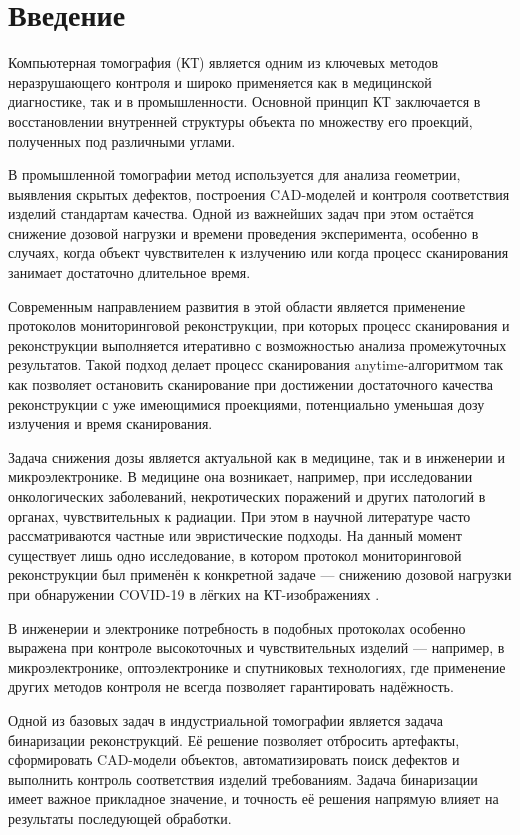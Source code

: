 \section{Введение}

Компьютерная томография (КТ) является одним из ключевых методов неразрушающего контроля и широко применяется как в медицинской диагностике, так и в промышленности. Основной принцип КТ заключается в восстановлении внутренней структуры объекта по множеству его проекций, полученных под различными углами.

В промышленной томографии метод используется для анализа геометрии, выявления скрытых дефектов, построения CAD-моделей и контроля соответствия изделий стандартам качества. Одной из важнейших задач при этом остаётся снижение дозовой нагрузки и времени проведения эксперимента, особенно в случаях, когда объект чувствителен к излучению или когда процесс сканирования занимает достаточно длительное время.

Современным направлением развития в этой области является применение протоколов мониторинговой реконструкции, при которых процесс сканирования и реконструкции выполняется итеративно с возможностью анализа промежуточных результатов. Такой подход делает процесс сканирования anytime-алгоритмом так как позволяет остановить сканирование при достижении достаточного качества реконструкции с уже имеющимися проекциями, потенциально уменьшая дозу излучения и время сканирования.

Задача снижения дозы является актуальной как в медицине, так и в инженерии и микроэлектронике. В медицине она возникает, например, при исследовании онкологических заболеваний, некротических поражений и других патологий в органах, чувствительных к радиации. При этом в научной литературе часто рассматриваются частные или эвристические подходы. На данный момент существует лишь одно исследование, в котором протокол мониторинговой реконструкции был применён к конкретной задаче — снижению дозовой нагрузки при обнаружении COVID-19 в лёгких на КТ-изображениях \cite{bulatov2023reducing}.

В инженерии и электронике потребность в подобных протоколах особенно выражена при контроле высокоточных и чувствительных изделий — например, в микроэлектронике, оптоэлектронике и спутниковых технологиях, где применение других методов контроля не всегда позволяет гарантировать надёжность.

Одной из базовых задач в индустриальной томографии является задача бинаризации реконструкций. Её решение позволяет отбросить артефакты, сформировать CAD-модели объектов, автоматизировать поиск дефектов и выполнить контроль соответствия изделий требованиям. Задача бинаризации имеет важное прикладное значение, и точность её решения напрямую влияет на результаты последующей обработки.

